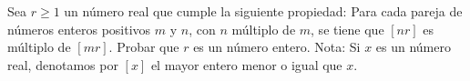 Sea $r \geq 1$ un número real que cumple la siguiente propiedad:  \newline 
Para cada pareja de números enteros positivos $m$ y $n$, con $n$ múltiplo de $m$, se tiene que $[nr]$ es múltiplo de $[mr]$. \newline 
Probar que $r$ es un número entero. \newline 
Nota: Si $x$ es un número real, denotamos por $[x]$ el mayor entero menor o igual que $x$.

